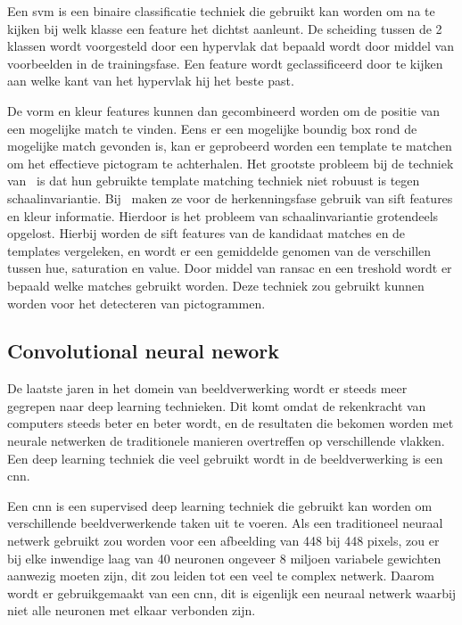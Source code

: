             Een \gls{svm} is een binaire classificatie techniek die gebruikt kan worden om na te kijken bij welk klasse een feature het dichtst aanleunt.
            De scheiding tussen de 2 klassen wordt voorgesteld door een hypervlak dat bepaald wordt door middel van voorbeelden in de trainingsfase.
            Een feature wordt geclassificeerd door te kijken aan welke kant van het hypervlak hij het beste past.

            De vorm en kleur features kunnen dan gecombineerd worden om de positie van een mogelijke match te vinden. Eens er een mogelijke boundig box rond de mogelijke match gevonden is,
            kan er geprobeerd worden een template te matchen om het effectieve pictogram te achterhalen. Het grootste probleem bij de techniek van~\cite{Fang2003} is
            dat hun gebruikte template matching techniek niet robuust is tegen schaalinvariantie.
            Bij~\cite{Zabihi2017} maken ze voor de herkenningsfase gebruik van \gls{sift}\cite{Lowe1999} features en kleur informatie.
            Hierdoor is het probleem van schaalinvariantie grotendeels opgelost.
            Hierbij worden de \gls{sift} features van de kandidaat matches en de templates vergeleken, en wordt er een gemiddelde genomen van de verschillen tussen hue, saturation en value.
            Door middel van \gls{ransac} en een treshold wordt er bepaald welke matches gebruikt worden. Deze techniek zou gebruikt kunnen worden voor het detecteren van pictogrammen.

        
        \subsection{Convolutional neural nework} \label{sec:yolo}
            De laatste jaren in het domein van beeldverwerking wordt er steeds meer gegrepen naar deep learning technieken.
            Dit komt omdat de rekenkracht van computers steeds beter en beter wordt, en de resultaten die bekomen worden met neurale netwerken de traditionele manieren overtreffen op verschillende vlakken.
            Een deep learning techniek die veel gebruikt wordt in de beeldverwerking is een \gls{cnn}.

            Een \gls{cnn} is een supervised deep learning techniek die gebruikt kan worden om verschillende beeldverwerkende taken uit te voeren.
            Als een traditioneel neuraal netwerk gebruikt zou worden voor een afbeelding van 448 bij 448 pixels, zou er bij elke inwendige laag van 40 neuronen ongeveer 8 miljoen variabele gewichten aanwezig moeten zijn,
            dit zou leiden tot een veel te complex netwerk.
            Daarom wordt er gebruikgemaakt van een \gls{cnn}, dit is eigenlijk een neuraal netwerk waarbij niet alle neuronen met elkaar verbonden zijn.

